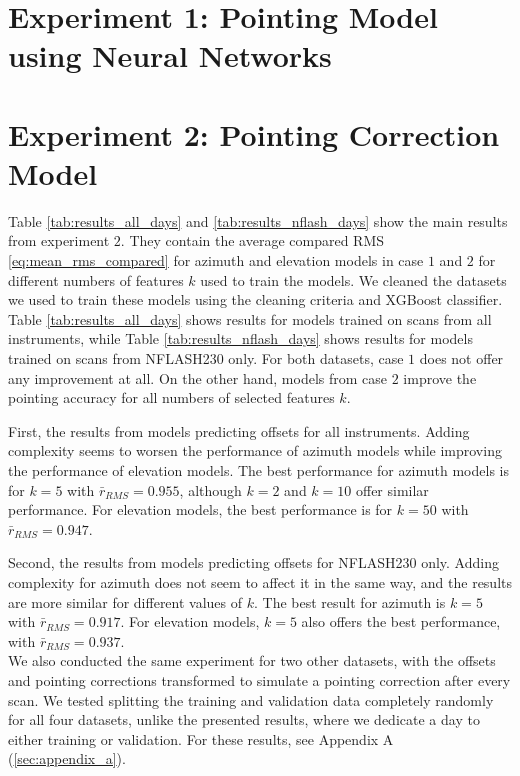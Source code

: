 
\section{Experiment 1: Pointing Model using Neural Networks}

\section{Experiment 2: Pointing Correction Model}
Table \ref{tab:results_all_days} and \ref{tab:results_nflash_days} show the main results from experiment $2$.
They contain the average compared RMS \eqref{eq:mean_rms_compared} for azimuth and elevation models in case $1$ and $2$ for different numbers of features $k$ used to train the models.
We cleaned the datasets we used to train these models using the cleaning criteria and XGBoost classifier.
Table \ref{tab:results_all_days} shows results for models trained on scans from all instruments, while Table \ref{tab:results_nflash_days} shows results for models
trained on scans from NFLASH230 only. For both datasets, case $1$ does not offer any improvement at all.
On the other hand, models from case $2$ improve the pointing accuracy for all numbers of selected features $k$.

First, the results from models predicting offsets for all instruments.
Adding complexity seems to worsen the performance of azimuth models while improving the performance of elevation models.
The best performance for azimuth models is for $k=5$ with $\bar{r}_{RMS}=0.955$, although $k=2$ and $k=10$ offer similar performance. 
For elevation models, the best performance is for $k=50$ with $\bar{r}_{RMS}=0.947$.

Second, the results from models predicting offsets for NFLASH230 only.
Adding complexity for azimuth does not seem to affect it in the same way, and the results are more similar for different values of $k$.
The best result for azimuth is $k=5$ with $\bar{r}_{RMS}=0.917$.
For elevation models, $k=5$ also offers the best performance, with $\bar{r}_{RMS}=0.937$.\\

We also conducted the same experiment for two other datasets, with the offsets and pointing corrections transformed to simulate a pointing correction after every scan.
We tested splitting the training and validation data completely randomly for all four datasets, unlike the presented results, where we dedicate a day to either training or validation.
For these results, see Appendix A (\ref{sec:appendix_a}). 

